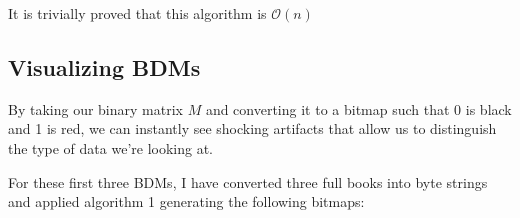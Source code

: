 \documentclass[12pt,a4paper]{article}
\begin{document}
It is trivially proved that this algorithm is $\mathcal{O}(n)$ 

\subsection{Visualizing BDMs}
By taking our binary matrix $M$ and converting it to a bitmap such that 0 is black and 1 is red, we can instantly see shocking artifacts that allow us to distinguish the type of data we're looking at.

For these first three BDMs, I have converted three full books into byte strings and applied algorithm 1 generating the following bitmaps:

\begin{figure}[!h]
    \centering
\end{figure}
\end{document}
